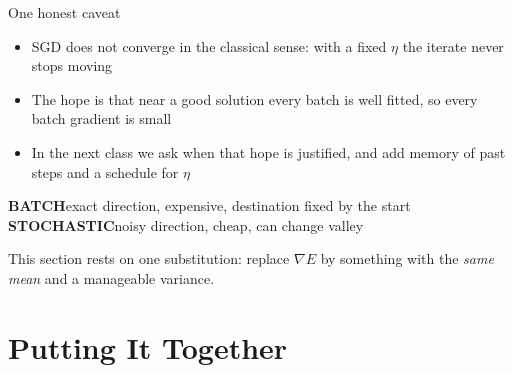 \documentclass[aspectratio=169, 11pt]{beamer}
\newcommand{\bspar}[2]{%
  \vfill
  {\scriptsize
  \begin{tcolorbox}[enhanced, sidebyside, sidebyside align=top,
                    lefthand ratio=0.485,
                    segmentation style={shc!35, line width=0.6pt},
                    colback=shc!5, colframe=shc!35, boxrule=0.5pt,
                    arc=1.2mm, left=1.6mm, right=1.6mm,
                    top=0.6mm, bottom=0.6mm,
                    before skip=0pt, after skip=0pt]
    {\color{shc}\textbf{BATCH}}\hspace{0.55em}#1
  \tcblower
    {\color{dpc}\textbf{STOCHASTIC}}\hspace{0.55em}#2
  \end{tcolorbox}}%
  \vspace{0.35em}%
}
\newcommand{\src}[3]{}      %
\begin{document}
\begin{frame}{One honest caveat}
  \src{prince2023}{section}{6.2.2}
  \vspace{0.2em}
  \begin{itemize}\itemsep0.45em
    \item SGD does not converge in the classical sense: with a fixed
          $\eta$ the iterate never stops moving
    \item The hope is that near a good solution every batch is well
          fitted, so every batch gradient is small
    \item In the next class we ask when that hope is justified, and add
          memory of past steps and a schedule for $\eta$
  \end{itemize}
  \vspace{0.35em}
  \bspar{exact direction, expensive, destination fixed by the start}
        {noisy direction, cheap, can change valley}
  \begin{redhighlight}
    This section rests on one substitution: replace $\nabla E$ by
    something with the \emph{same mean} and a manageable variance.
  \end{redhighlight}
\end{frame}

\section{Putting It Together}
\end{document}

